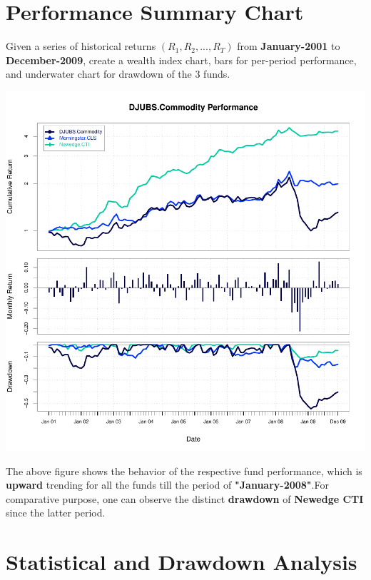 \documentclass[12pt,letterpaper,english]{article}
\begin{document}

\section{Performance Summary Chart}

Given a series  of historical returns \((R_1,R_2, . . .,R_T)\) from \textbf{January-2001} to \textbf{December-2009}, create a wealth index chart, bars for per-period performance, and underwater chart for drawdown of the 3 funds.

\includegraphics{Commodity-002}

The above figure shows the behavior of the respective fund performance, which is \textbf{upward} trending for all the funds till the period of \textbf{"January-2008"}.For comparative purpose, one can observe the distinct \textbf{drawdown} of \textbf{Newedge CTI} since the latter period.

\section{Statistical and Drawdown Analysis}
\end{document}
